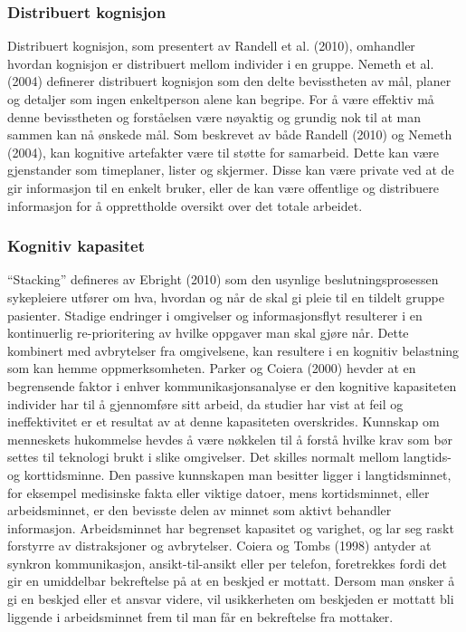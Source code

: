 \subsubsection{Distribuert kognisjon}
Distribuert kognisjon, som presentert av Randell et al. (2010), omhandler hvordan kognisjon er distribuert mellom individer i en gruppe. Nemeth et al. (2004) definerer distribuert kognisjon som den delte bevisstheten av mål, planer og detaljer som ingen enkeltperson alene kan begripe. For å være effektiv må denne bevisstheten og forståelsen være nøyaktig og grundig nok til at man sammen kan nå ønskede mål. Som beskrevet av både Randell (2010) og Nemeth (2004), kan kognitive artefakter være til støtte for samarbeid. Dette kan være gjenstander som timeplaner, lister og skjermer. Disse kan være private ved at de gir informasjon til en enkelt bruker, eller de kan være offentlige og distribuere informasjon for å opprettholde oversikt over det totale arbeidet.

\subsubsection{Kognitiv kapasitet}
“Stacking” defineres av Ebright (2010) som den usynlige beslutningsprosessen sykepleiere utfører om hva, hvordan og når de skal gi pleie til en tildelt gruppe pasienter. Stadige endringer i omgivelser og informasjonsflyt resulterer i en kontinuerlig re-prioritering av hvilke oppgaver man skal gjøre når. Dette kombinert med avbrytelser fra omgivelsene, kan resultere i en kognitiv belastning som kan hemme oppmerksomheten. Parker og Coiera (2000) hevder at en begrensende faktor i enhver kommunikasjonsanalyse er den kognitive kapasiteten individer har til å gjennomføre sitt arbeid, da studier har vist at feil og ineffektivitet er et resultat av at denne kapasiteten overskrides. Kunnskap om menneskets hukommelse hevdes å være nøkkelen til å forstå hvilke krav som bør settes til teknologi brukt i slike omgivelser. Det skilles normalt mellom langtids- og korttidsminne. Den passive kunnskapen man besitter ligger i langtidsminnet, for eksempel medisinske fakta eller viktige datoer, mens kortidsminnet, eller arbeidsminnet, er den bevisste delen av minnet som aktivt behandler informasjon. Arbeidsminnet har begrenset kapasitet og varighet, og lar seg raskt forstyrre av distraksjoner og avbrytelser. Coiera og Tombs (1998) \nocite{Coiera98} antyder at synkron kommunikasjon, ansikt-til-ansikt eller per telefon, foretrekkes fordi det gir en umiddelbar bekreftelse på at en beskjed er mottatt. Dersom man ønsker å gi en beskjed eller et ansvar videre, vil usikkerheten om beskjeden er mottatt bli liggende i arbeidsminnet frem til man får en bekreftelse fra mottaker. 



